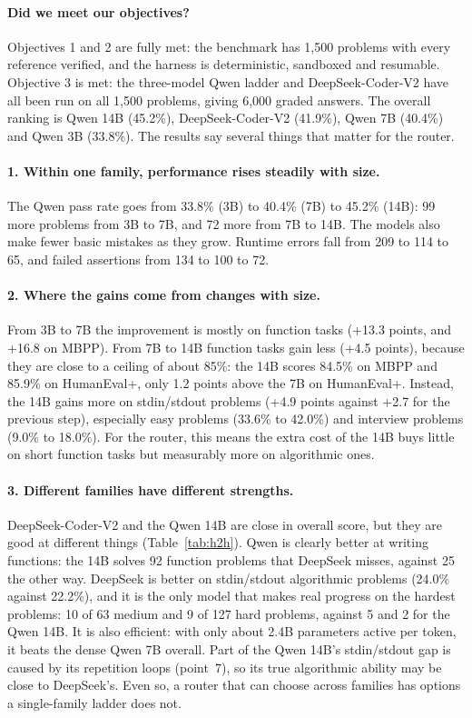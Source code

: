 \paragraph{Did we meet our objectives?} Objectives 1 and 2 are fully met: the benchmark has 1,500 problems with every reference verified, and the harness is deterministic, sandboxed and resumable. Objective 3 is met: the three-model Qwen ladder and DeepSeek-Coder-V2 have all been run on all 1,500 problems, giving 6,000 graded answers. The overall ranking is Qwen 14B (45.2\%), DeepSeek-Coder-V2 (41.9\%), Qwen 7B (40.4\%) and Qwen 3B (33.8\%). The results say several things that matter for the router.

\paragraph{1. Within one family, performance rises steadily with size.} The Qwen pass rate goes from 33.8\% (3B) to 40.4\% (7B) to 45.2\% (14B): 99 more problems from 3B to 7B, and 72 more from 7B to 14B. The models also make fewer basic mistakes as they grow. Runtime errors fall from 209 to 114 to 65, and failed assertions from 134 to 100 to 72.

\paragraph{2. Where the gains come from changes with size.} From 3B to 7B the improvement is mostly on function tasks (+13.3 points, and +16.8 on MBPP). From 7B to 14B function tasks gain less (+4.5 points), because they are close to a ceiling of about 85\%: the 14B scores 84.5\% on MBPP and 85.9\% on HumanEval+, only 1.2 points above the 7B on HumanEval+. Instead, the 14B gains more on stdin/stdout problems (+4.9 points against +2.7 for the previous step), especially easy problems (33.6\% to 42.0\%) and interview problems (9.0\% to 18.0\%). For the router, this means the extra cost of the 14B buys little on short function tasks but measurably more on algorithmic ones.

\paragraph{3. Different families have different strengths.} DeepSeek-Coder-V2 and the Qwen 14B are close in overall score, but they are good at different things (Table~\ref{tab:h2h}). Qwen is clearly better at writing functions: the 14B solves 92 function problems that DeepSeek misses, against 25 the other way. DeepSeek is better on stdin/stdout algorithmic problems (24.0\% against 22.2\%), and it is the only model that makes real progress on the hardest problems: 10 of 63 medium and 9 of 127 hard problems, against 5 and 2 for the Qwen 14B. It is also efficient: with only about 2.4B parameters active per token, it beats the dense Qwen 7B overall. Part of the Qwen 14B's stdin/stdout gap is caused by its repetition loops (point~7), so its true algorithmic ability may be close to DeepSeek's. Even so, a router that can choose across families has options a single-family ladder does not.

